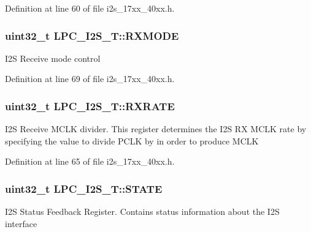 Definition at line 60 of file i2s\+\_\+17xx\+\_\+40xx.\+h.

\subsubsection[{\texorpdfstring{R\+X\+M\+O\+DE}{RXMODE}}]{ uint32\+\_\+t L\+P\+C\+\_\+\+I2\+S\+\_\+\+T\+::\+R\+X\+M\+O\+DE}\hypertarget{structLPC__I2S__T_a257e2de4bfa371adba9eeb4c2e95fe09}{}\label{structLPC__I2S__T_a257e2de4bfa371adba9eeb4c2e95fe09}
I2S Receive mode control 

Definition at line 69 of file i2s\+\_\+17xx\+\_\+40xx.\+h.

\subsubsection[{\texorpdfstring{R\+X\+R\+A\+TE}{RXRATE}}]{ uint32\+\_\+t L\+P\+C\+\_\+\+I2\+S\+\_\+\+T\+::\+R\+X\+R\+A\+TE}\hypertarget{structLPC__I2S__T_a03d51065fa11a182809e189b919b034a}{}\label{structLPC__I2S__T_a03d51065fa11a182809e189b919b034a}
I2S Receive M\+C\+LK divider. This register determines the I2S RX M\+C\+LK rate by specifying the value to divide P\+C\+LK by in order to produce M\+C\+LK 

Definition at line 65 of file i2s\+\_\+17xx\+\_\+40xx.\+h.

\subsubsection[{\texorpdfstring{S\+T\+A\+TE}{STATE}}]{ uint32\+\_\+t L\+P\+C\+\_\+\+I2\+S\+\_\+\+T\+::\+S\+T\+A\+TE}\hypertarget{structLPC__I2S__T_a35299409c86d4860e936a7ff3e5603bf}{}\label{structLPC__I2S__T_a35299409c86d4860e936a7ff3e5603bf}
I2S Status Feedback Register. Contains status information about the I2S interface 

